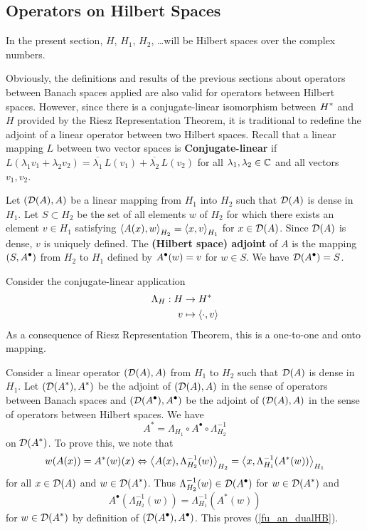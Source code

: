 \subsection{Operators on Hilbert Spaces}

In the present section, $H$, $H_1$, $H_2$, \ldots will be Hilbert
spaces over the complex numbers.

Obviously, the definitions and results of the previous
sections about operators between Banach spaces applied are also valid
for operators between Hilbert spaces.
However, since there is a conjugate-linear isomorphism between
$\displaystyle H^\ast$ and $H$ provided by the Riesz Representation
Theorem, it is traditional to redefine the adjoint of a linear
operator between two Hilbert spaces.  Recall that a linear mapping $L$
between two vector spaces is
{\bfseries Conjugate-linear}
if $L(\lambda_1v_1 + \lambda_2 v_2) = \overline{\lambda_1}\, L(v_1)
+ \overline{\lambda_2}\, L(v_2)$ for all $\lambda_1, \lambda_2 \in \mathbb{C}$ and
all vectors $v_1,v_2$.

\begin{defn} \label{fu_an_dualHB_def}
Let $(\mathcal{D}(A),A)$ be a linear mapping from $H_1$ into $H_2$ such that
$\mathcal{D}(A)$ is dense in $H_1$.  Let $S \subset H_2$ be the set of all
elements $w$ of $H_2$ for which there exists an element $v \in H_1$
satisfying $\displaystyle \left\langle{A(x)} , {w}\right\rangle_{H_2} = \left\langle{x} , {v}\right\rangle_{H_1}$ for $x
\in \mathcal{D}(A)$.  Since $\mathcal{D}(A)$ is dense, $v$ is uniquely defined.  The
{\bfseries (Hilbert space) adjoint} of $A$ is the mapping $\displaystyle (S,A^\bullet)$ from
$H_2$ to $H_1$ defined by $\displaystyle A^\bullet(w) = v$ for $w\in S$.
We have $\displaystyle \mathcal{D}(A^\bullet) = S$.
\end{defn}

Consider the conjugate-linear application
\begin{align*}
\Lambda_H : H &\rightarrow H^\ast \\
v & \mapsto  \left\langle{\cdot} , {v}\right\rangle
\end{align*}
As a consequence of Riesz Representation Theorem, this is a one-to-one
and onto mapping.

Consider a linear operator $(\mathcal{D}(A),A)$ from $H_1$ to $H_2$ such
that $\mathcal{D}(A)$ is dense in $H_1$.  Let
$\displaystyle (\mathcal{D}(A^\ast),A^\ast)$ be the
adjoint of $(\mathcal{D}(A),A)$ in the sense of operators between Banach
spaces and $\displaystyle (\mathcal{D}(A^\bullet),A^\bullet)$ be the adjoint
of $(\mathcal{D}(A),A)$ in the sense of operators between Hilbert spaces.  We have
\begin{equation} \label{fu_an_dualHB}
A^\ast = \Lambda_{H_1} \circ A^\bullet \circ \Lambda_{H_2}^{-1}
\end{equation}
on $\displaystyle \mathcal{D}(A^\ast)$.  To prove this, we note that
\[
w(A(x)) = A^\ast(w)(x) \Leftrightarrow
\left\langle{A(x)} , {\Lambda_{H_2}^{-1}(w)}\right\rangle_{H_2} =
\left\langle{x} , {\Lambda_{H_1}^{-1}(A^\ast(w))}\right\rangle_{H_1}
\]
for all $x \in \mathcal{D}(A)$ and $\displaystyle w\in \mathcal{D}(A^\ast)$.  Thus
$\displaystyle \Lambda_{H_2}^{-1}(w) \in \mathcal{D}(A^\bullet)$
for $\displaystyle w \in \mathcal{D}(A^\ast)$ and
\[
A^\bullet(\Lambda_{H_2}^{-1}(w)) = \Lambda_{H_1}^{-1}(A^\ast(w))
\]
for $\displaystyle w\in \mathcal{D}(A^\ast)$ by definition of
$\displaystyle (\mathcal{D}(A^\bullet),A^\bullet)$.  This proves (\ref{fu_an_dualHB}).

